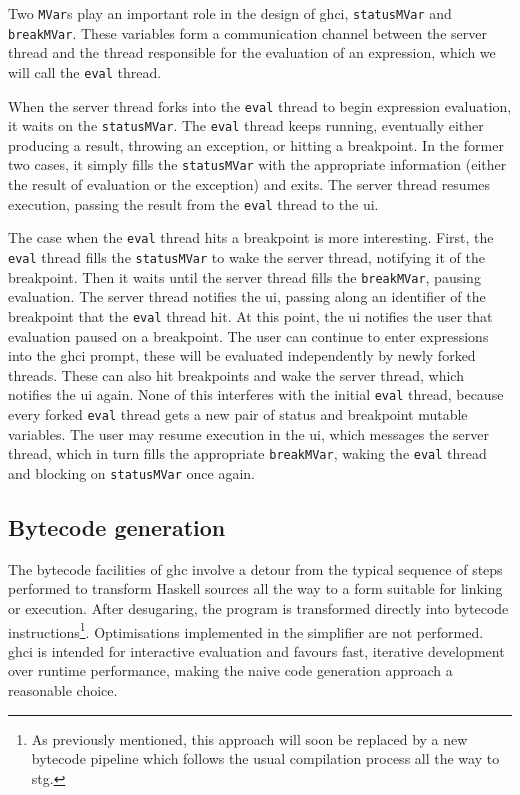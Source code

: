 \documentclass[thesis=B,english]{FITthesis}[2019/12/23]
\newcommand{\hsType}[1]{\texttt{#1}}
\newcommand{\hsIdent}[1]{\texttt{#1}}
\begin{document}
Two \hsType{MVar}s play an important role in the design of \acrshort{ghci},
\hsIdent{statusMVar} and \hsIdent{breakMVar}. These variables form a
communication channel between the server thread and the thread responsible for
the evaluation of an expression, which we will call the \texttt{eval} thread.

When the server thread forks into the \texttt{eval} thread to begin expression
evaluation, it waits on the \hsIdent{statusMVar}. The \texttt{eval} thread
keeps running, eventually either producing a result, throwing an exception, or
hitting a breakpoint. In the former two cases, it simply fills the
\hsIdent{statusMVar} with the appropriate information (either the result of
evaluation or the exception) and exits. The server thread resumes execution,
passing the result from the \texttt{eval} thread to the \acrshort{ui}.

The case when the \texttt{eval} thread hits a breakpoint is more interesting.
First, the \texttt{eval} thread fills the \hsIdent{statusMVar} to wake the
server thread, notifying it of the breakpoint. Then it waits until the server
thread fills the \hsIdent{breakMVar}, pausing evaluation. The server thread
notifies the \acrshort{ui}, passing along an identifier of the breakpoint that
the \texttt{eval} thread hit. At this point, the \acrshort{ui} notifies the
user that evaluation paused on a breakpoint. The user can continue to enter
expressions into the \acrshort{ghci} prompt, these will be evaluated
independently by newly forked threads. These can also hit breakpoints and wake
the server thread, which notifies the \acrshort{ui} again. None of this
interferes with the initial \texttt{eval} thread, because every forked
\texttt{eval} thread gets a new pair of status and breakpoint mutable
variables. The user may resume execution in the \acrshort{ui}, which messages
the server thread, which in turn fills the appropriate \hsIdent{breakMVar},
waking the \texttt{eval} thread and blocking on \hsIdent{statusMVar} once
again.

\subsection*{Bytecode generation}
The bytecode facilities of \acrshort{ghc} involve a detour from the typical
sequence of steps performed to transform Haskell sources all the way to a form
suitable for linking or execution. After desugaring, the program is transformed
directly into bytecode instructions\footnote{
	As previously mentioned, this approach will soon be replaced by a new
	bytecode pipeline which follows the usual compilation process all the way
	to \acrshort{stg}\cite{mr-ghci-stg-unboxed}.
}. Optimisations implemented in the simplifier are not performed.
\acrshort{ghci} is intended for interactive evaluation and favours fast,
iterative development over runtime performance, making the naive code
generation approach a reasonable choice.
\end{document}
